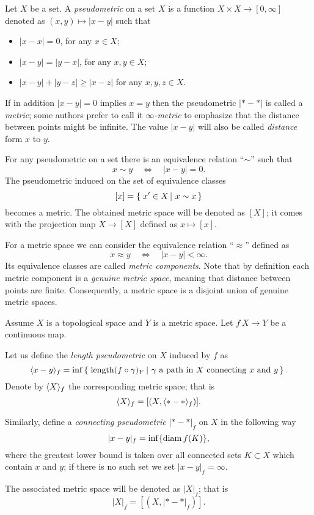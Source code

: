 \documentclass{article}
\begin{document}
Let $X$ be a set.
A \emph{pseudometric} on a set $X$ 
is a function $X\times X\to[0,\infty]$ denoted as $(x,y)\mapsto |x-y|$
such that 
\begin{itemize}
\item $|x-x|=0$, for any $x\in X$;
\item $|x-y|=|y-x|$, for any $x,y\in X$;
\item $|x-y|+|y-z|\ge|x-z|$ for any  $x,y,z\in X$.
\end{itemize}
If in addition $|x-y|=0$ implies $x=y$ then the pseudometric $|{*}-{*}|$ is called a \emph{metric}; some authors prefer to call it \emph{$\infty$-metric} to emphasize that the distance between points might be infinite.
The value $|x-y|$ will also be called \emph{distance} form $x$ to $y$.

For any pseudometric on a set there is an equivalence relation ``$\sim$'' such that 
\[x\sim y\quad\iff\quad|x-y|=0.\]
The pseudometric induced  on the set of equivalence classes 
\[[x]=\set{x'\in X}{x\sim x}\] becomes a metric.
The obtained metric space will be denoted as $[X]$;
it comes with the projection map $X\to [X]$ defined as $x\mapsto [x]$.


For a metric space we can consider the equivalence relation ``$\approx$'' defined as 
\[x\approx y\quad\iff\quad|x-y|<\infty.\]
Its equivalence classes are called \emph{metric components}.
Note that by definition each metric component is a \emph{genuine metric space}, meaning that distance between points are finite.
Consequently, a metric space is a disjoint union of genuine metric spaces.

Assume $X$ is a topological space and $Y$ is a metric space.
Let $f\:X\to Y$ be a continuous map. 

Let us define the \emph{length pseudometric} on $X$ induced by $f$ as
\[\< x-y\>_f
=
\inf
\set{\length(f\circ\gamma)_Y}{\gamma\ \text{a path in}\  X\ \text{connecting}\ x\ \text{and}\ y}.\]
Denote by $\langle X\rangle_f$ the corresponding metric space; that is 
\[\langle X\rangle_f=[(X,\langle{*}-{*}\rangle_f)].\] 

Similarly, define a \emph{connecting pseudometric} $|{*}-{*}|_f$ on $X$ in
the following way
\[|x-y|_f=\inf\{\mathop{\rm diam}\nolimits f(K)\},\]
where the greatest lower bound is taken over all connected sets $K\subset X$ which contain $x$ and $y$;
if there is no such set we set $|x-y|_f=\infty$. 

The associated metric space will be
denoted as $|X|_f$;
that is 
\[| X|_f=[(X,|{*}-{*}|_f)].\]
\end{document}
